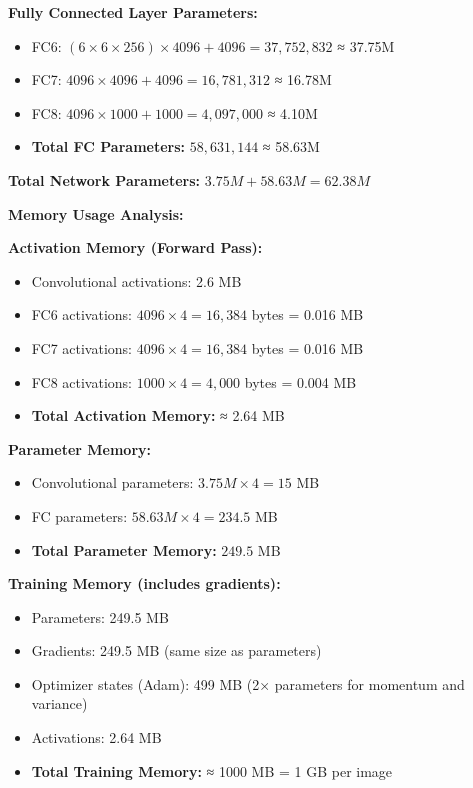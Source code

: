 \documentclass[12pt]{article}
\begin{document}
\begin{enumerate}[(a)]
{    \textbf{Fully Connected Layer Parameters:}
    \begin{itemize}
        \item FC6: $(6 \times 6 \times 256) \times 4096 + 4096 = 37,752,832$ ≈ 37.75M
        \item FC7: $4096 \times 4096 + 4096 = 16,781,312$ ≈ 16.78M
        \item FC8: $4096 \times 1000 + 1000 = 4,097,000$ ≈ 4.10M
        \item \textbf{Total FC Parameters:} $58,631,144$ ≈ 58.63M
    \end{itemize}
    
    \textbf{Total Network Parameters:} $3.75M + 58.63M = 62.38M$
    
    \textbf{Memory Usage Analysis:}
    
    \textbf{Activation Memory (Forward Pass):}
    \begin{itemize}
        \item Convolutional activations: 2.6 MB
        \item FC6 activations: $4096 \times 4 = 16,384$ bytes = 0.016 MB
        \item FC7 activations: $4096 \times 4 = 16,384$ bytes = 0.016 MB
        \item FC8 activations: $1000 \times 4 = 4,000$ bytes = 0.004 MB
        \item \textbf{Total Activation Memory:} ≈ 2.64 MB
    \end{itemize}
    
    \textbf{Parameter Memory:}
    \begin{itemize}
        \item Convolutional parameters: $3.75M \times 4 = 15$ MB
        \item FC parameters: $58.63M \times 4 = 234.5$ MB  
        \item \textbf{Total Parameter Memory:} $249.5$ MB
    \end{itemize}
    
    \textbf{Training Memory (includes gradients):}
    \begin{itemize}
        \item Parameters: 249.5 MB
        \item Gradients: 249.5 MB (same size as parameters)
        \item Optimizer states (Adam): 499 MB (2× parameters for momentum and variance)
        \item Activations: 2.64 MB
        \item \textbf{Total Training Memory:} ≈ 1000 MB = 1 GB per image
    \end{itemize}
    
}
\end{enumerate}
\end{document}
